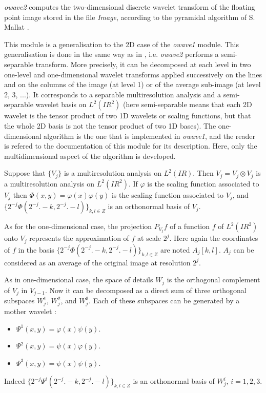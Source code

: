 \def\real{I\!\!R}

{\em owave2} computes the two-dimensional discrete wavelet transform
of the floating point image stored in the file {\em Image}, 
according to the pyramidal algorithm of S. Mallat \cite{mallat:theory}. 

This module is a generalisation to the 2D case of the {\em owave1} module. 
This generalisation is done in the same way as in \cite{mallat:theory}, i.e. 
{\em owave2}  performs a semi-separable transform. More precisely, 
it can be decomposed at each level in two one-level and one-dimensional 
wavelet transforms applied successively on the lines and on the columns 
of the image (at level 1) or of the average sub-image (at level 2, 3, ...). 
It corresponds to a separable multiresolution analysis 
and a semi-separable wavelet basis on \( L^{2}(\real^{2}) \) 
(here semi-separable means that each 2D wavelet is the tensor product 
of two 1D wavelets or scaling functions, but that the whole 2D basis 
is not the tensor product of two 1D bases). 
The one-dimensional algorithm is the one that is implemented in {\em owave1}, 
and the reader is refered to the documentation of this module 
for its description. Here, only the multidimensional aspect of the algorithm 
is developed. 

Suppose that \( \{V_{j}\} \) is a multiresolution analysis on $L^{2}(\real)$. 
Then ${ V}_{j} = V_{j} \otimes V_{j}$ is a multiresolution 
analysis on $L^{2}(\real^{2})$. If $\varphi$ is the scaling function 
associated to $V_{j}$ then $\Phi(x,y) = \varphi(x) \varphi(y)$ 
is the scaling function associated to ${ V}_{j}$, 
and $\{ 2^{-j} \Phi(2^{-j}. - k, 2^{-j}. - l)\}_{k,l \in Z}$ is an orthonormal 
basis of ${ V}_{j}$.

As for the one-dimensional case, the projection $P_{{ V}_{j}} f$ 
of a function $f$ of $L^{2}(\real^{2})$ onto ${ V}_{j}$ represents 
the approximation of \( f \) at scale \( 2^{j} \). Here again the coordinates 
of $f$ in the basis  $\{ 2^{-j} \Phi(2^{-j}. - k, 2^{-j}. - l)\}_{k,l \in Z}$ 
are noted \( A_{j}[k,l] \). $A_j$ can be considered as an average 
of the original image at resolution $2^j$.


As in one-dimensional case, the space of details ${ W}_{j}$ 
is the orthogonal complement of ${ V}_{j}$ in ${ V}_{j-1}$. 
Now it can be decomposed as a direct sum of three orthogonal subspaces 
${ W}^{1}_{j}$, ${ W}^{2}_{j}$, and ${ W}^{3}_{j}$. 
Each of these subspaces can be generated by a mother wavelet :
\begin{itemize}
\item
\( \Psi^{1}(x,y) = \varphi(x) \psi(y) \).
\item
\( \Psi^{2}(x,y) = \psi(x) \varphi(y) \).
\item
\( \Psi^{3}(x,y) = \psi(x) \psi(y) \).
\end{itemize}
Indeed \( \{ 2^{-j} \Psi^{i}(2^{-j}. - k, 2^{-j}. - l)\}_{k,l \in Z} \) 
is an orthonormal basis of ${ W}^{i}_{j}$, $i=1,2,3$.

